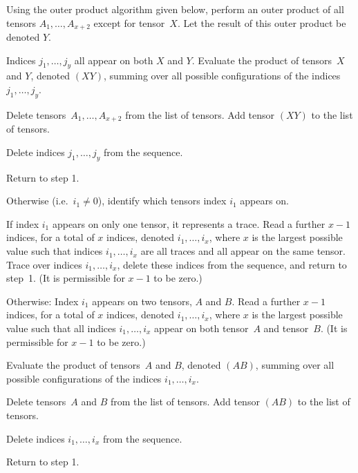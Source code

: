 \begin{description}[align=left,font=\normalfont,itemsep=2pt]
\begin{description}[align=left,font=\normalfont,itemsep=2pt]
\begin{description}[align=left,font=\normalfont,itemsep=2pt]
\item[3c5] Using the outer product algorithm given below, perform an outer product of all tensors ${A}_1,\ldots,{A}_{x+2}$ except for tensor~$X$. Let the result of this outer product be denoted $Y$.
\item[3c6] Indices $j_1,\ldots,j_y$ all appear on both $X$ and $Y$. Evaluate the product of tensors~$X$ and $Y$, denoted $(XY)$, summing over all possible configurations of the indices $j_1,\ldots,j_y$.
\item[3c7] Delete tensors~${A}_1,\ldots,{A}_{x+2}$ from the list of tensors. Add tensor $(XY)$ to the list of tensors.
\item[3c8] Delete indices $j_1,\ldots,j_y$ from the sequence.
\item[3c9] Return to step 1.
\end{description}
\end{description}
\item[4] Otherwise (i.e.~$i_1\not=0$), identify which tensors index $i_1$ appears on.
\item[5] If index $i_1$ appears on only one tensor, it represents a trace. Read a further $x-1$ indices, for a total of $x$ indices, denoted $i_1,\ldots,i_x$, where $x$ is the largest possible value such that indices $i_1,\ldots,i_x$ are all traces and all appear on the same tensor. Trace over indices $i_1,\ldots,i_x$, delete these indices from the sequence, and return to step~1. (It is permissible for $x-1$ to be zero.)
\item[6] Otherwise: Index $i_1$ appears on two tensors, $A$ and $B$. Read a further $x-1$ indices, for a total of $x$ indices, denoted $i_1,\ldots,i_x$, where $x$ is the largest possible value such that all indices $i_1,\ldots,i_x$ appear on both tensor~$A$ and tensor~$B$. (It is permissible for $x-1$ to be zero.)
\item[7] Evaluate the product of tensors~$A$ and $B$, denoted $(AB)$, summing over all possible configurations of the indices $i_1,\ldots,i_x$.
\item[8] Delete tensors~$A$ and $B$ from the list of tensors. Add tensor $(AB)$ to the list of tensors.
\item[9] Delete indices $i_1,\ldots,i_x$ from the sequence.
\item[10] Return to step 1.
\end{description}


